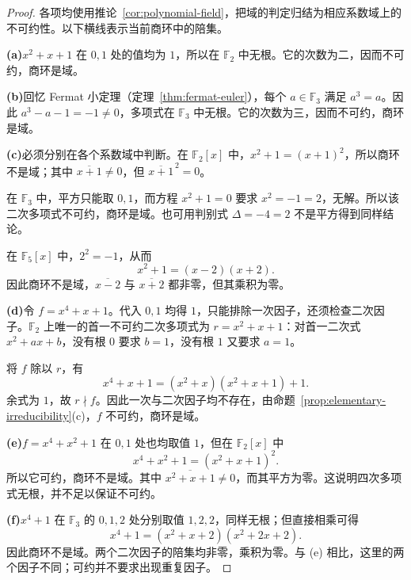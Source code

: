 \documentclass[lang=cn,a4paper,fontset=none,zihao=false,10pt,openany,twoside]{beautybook}
\numberwithin{algorithm}{chapter}
\begin{document}
\begin{proof}
各项均使用推论~\ref{cor:polynomial-field}，把域的判定归结为相应系数域上的不可约性。以下横线表示当前商环中的陪集。

\par\smallskip\noindent\textbf{(a)}\quad $x^2+x+1$ 在 $0,1$ 处的值均为 $1$，所以在 $\mathbb F_2$ 中无根。它的次数为二，因而不可约，商环是域。

\par\smallskip\noindent\textbf{(b)}\quad 回忆 Fermat 小定理（定理~\ref{thm:fermat-euler}），每个 $a\in\mathbb F_3$ 满足 $a^3=a$。因此 $a^3-a-1=-1\ne0$，多项式在 $\mathbb F_3$ 中无根。它的次数为三，因而不可约，商环是域。

\par\smallskip\noindent\textbf{(c)}\quad 必须分别在各个系数域中判断。在 $\mathbb F_2[x]$ 中，$x^2+1=(x+1)^2$，所以商环不是域；其中 $\overline{x+1}\ne0$，但 $\overline{x+1}^{\,2}=0$。

在 $\mathbb F_3$ 中，平方只能取 $0,1$，而方程 $x^2+1=0$ 要求 $x^2=-1=2$，无解。所以该二次多项式不可约，商环是域。也可用判别式 $\Delta=-4=2$ 不是平方得到同样结论。

在 $\mathbb F_5[x]$ 中，$2^2=-1$，从而
\[
 x^2+1=(x-2)(x+2).
\]
因此商环不是域，$\overline{x-2}$ 与 $\overline{x+2}$ 都非零，但其乘积为零。

\par\smallskip\noindent\textbf{(d)}\quad 令 $f=x^4+x+1$。代入 $0,1$ 均得 $1$，只能排除一次因子，还须检查二次因子。$\mathbb F_2$ 上唯一的首一不可约二次多项式为 $r=x^2+x+1$：对首一二次式 $x^2+ax+b$，没有根 $0$ 要求 $b=1$，没有根 $1$ 又要求 $a=1$。

将 $f$ 除以 $r$，有
\[
 x^4+x+1=(x^2+x)(x^2+x+1)+1.
\]
余式为 $1$，故 $r\nmid f$。因此一次与二次因子均不存在，由命题~\ref{prop:elementary-irreducibility}(c)，$f$ 不可约，商环是域。

\par\smallskip\noindent\textbf{(e)}\quad $f=x^4+x^2+1$ 在 $0,1$ 处也均取值 $1$，但在 $\mathbb F_2[x]$ 中
\[
 x^4+x^2+1=(x^2+x+1)^2.
\]
所以它可约，商环不是域。其中 $\overline{x^2+x+1}\ne0$，而其平方为零。这说明四次多项式无根，并不足以保证不可约。

\par\smallskip\noindent\textbf{(f)}\quad $x^4+1$ 在 $\mathbb F_3$ 的 $0,1,2$ 处分别取值 $1,2,2$，同样无根；但直接相乘可得
\[
 x^4+1=(x^2+x+2)(x^2+2x+2).
\]
因此商环不是域。两个二次因子的陪集均非零，乘积为零。与 (e) 相比，这里的两个因子不同；可约并不要求出现重复因子。
\end{proof}
\end{document}
